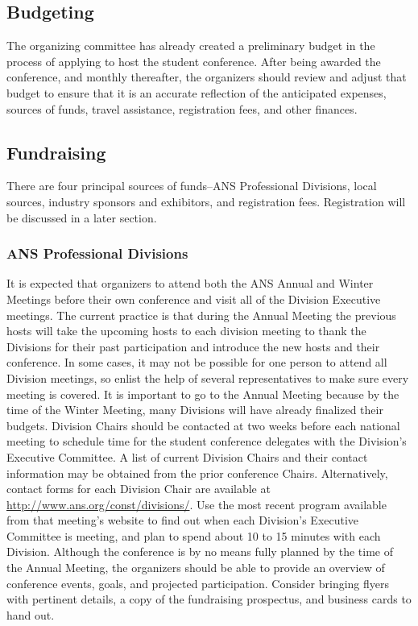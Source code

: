 \documentclass[12pt]{article}
\begin{document}
\subsection{Budgeting}
The organizing committee has already created a preliminary budget in the process of applying to host the student conference.
After being awarded the conference, and monthly thereafter, the organizers should review and adjust that budget to ensure that it is an accurate reflection of the anticipated expenses, sources of funds, travel assistance, registration fees, and other finances.

\subsection{Fundraising}
There are four principal sources of funds\---ANS Professional Divisions, local sources, industry sponsors and exhibitors, and registration fees.
Registration will be discussed in a later section.

\subsubsection{ANS Professional Divisions}
It is expected that organizers to attend both the ANS Annual and Winter Meetings before their own conference and visit all of the Division Executive meetings.
The current practice is that during the Annual Meeting the previous hosts will take the upcoming hosts to each division meeting to thank the Divisions for their past participation and introduce the new hosts and their conference.
In some cases, it may not be possible for one person to attend all Division meetings, so enlist the help of several representatives to make sure every meeting is covered.
It is important to go to the Annual Meeting because by the time of the Winter Meeting, many Divisions will have already finalized their budgets.
Division Chairs should be contacted at two weeks before each national meeting to schedule time for the student conference delegates with the Division's Executive Committee.
A list of current Division Chairs and their contact information may be obtained from the prior conference Chairs.
Alternatively, contact forms for each Division Chair are available at \href{http://www.ans.org/const/divisions/}{http://www.ans.org/const/divisions/}.
Use the most recent program available from that meeting's website to find out when each Division's Executive Committee is meeting, and plan to spend about 10 to 15 minutes with each Division.
Although the conference is by no means fully planned by the time of the Annual Meeting, the organizers should be able to provide an overview of conference events, goals, and projected participation.
Consider bringing flyers with pertinent details, a copy of the fundraising prospectus, and business cards to hand out.
\end{document}
